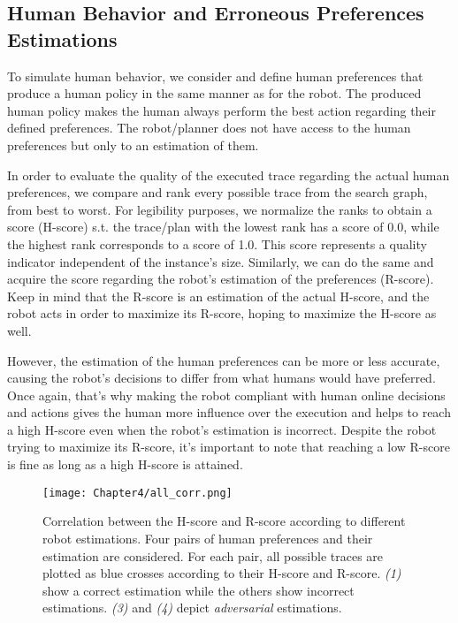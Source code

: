     \subsection{Human Behavior and Erroneous Preferences Estimations}

To simulate human behavior, we consider and define human preferences that produce a human policy in the same manner as for the robot. The produced human policy makes the human always perform the best action regarding their defined preferences. The robot/planner does not have access to the human preferences but only to an estimation of them.

In order to evaluate the quality of the executed trace regarding the actual human preferences, we compare and rank every possible trace from the search graph, from best to worst. For legibility purposes, we normalize the ranks to obtain a score (H-score) s.t. the trace/plan with the lowest rank has a score of 0.0, while the highest rank corresponds to a score of 1.0. This score represents a quality indicator independent of the instance's size. 
Similarly, we can do the same and acquire the score regarding the robot's estimation of the preferences (R-score). 
Keep in mind that the R-score is an estimation of the actual H-score, and the robot acts in order to maximize its R-score, hoping to maximize the H-score as well.

However, the estimation of the human preferences can be more or less accurate, causing the robot's decisions to differ from what humans would have preferred. Once again, that's why making the robot compliant with human online decisions and actions gives the human more influence over the execution and helps to reach a high H-score even when the robot's estimation is incorrect.
Despite the robot trying to maximize its R-score, it's important to note that reaching a low R-score is fine as long as a high H-score is attained.

\begin{figure}
    \texttt{[image: Chapter4/all\_corr.png]}
    \caption{
    Correlation between the H-score and R-score according to different robot estimations. Four pairs of human preferences and their estimation are considered. For each pair, all possible traces are plotted as blue crosses according to their H-score and R-score. \textit{(1)} show a correct estimation while the others show incorrect estimations. \textit{(3)} and \textit{(4)} depict \textit{adversarial} estimations.
    }
    \label{fig:corr}
\end{figure}

